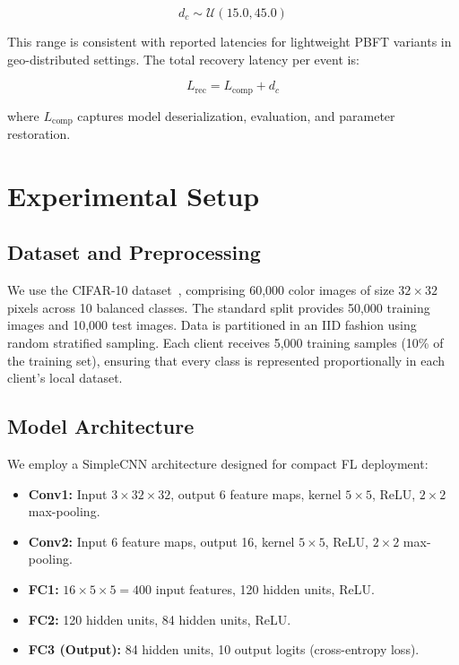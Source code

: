 \documentclass[conference]{IEEEtran}
\begin{document}
\begin{equation}
d_c \sim \mathcal{U}(15.0, 45.0)
\end{equation}

This range is consistent with reported latencies for lightweight PBFT variants in geo-distributed settings. The total recovery latency per event is:

\begin{equation}
L_{\text{rec}} = L_{\text{comp}} + d_c
\end{equation}

where $L_{\text{comp}}$ captures model deserialization, evaluation, and parameter restoration.

\section{Experimental Setup}
\label{sec:experiments}

\subsection{Dataset and Preprocessing}
We use the CIFAR-10 dataset~\cite{krizhevsky2009cifar}, comprising 60,000 color images of size $32\times32$ pixels across 10 balanced classes. The standard split provides 50,000 training images and 10,000 test images. Data is partitioned in an IID fashion using random stratified sampling. Each client receives 5,000 training samples (10\% of the training set), ensuring that every class is represented proportionally in each client's local dataset.

\subsection{Model Architecture}
We employ a SimpleCNN architecture designed for compact FL deployment:

\begin{itemize}
    \item \textbf{Conv1:} Input $3 \times 32 \times 32$, output 6 feature maps, kernel $5 \times 5$, ReLU, $2 \times 2$ max-pooling.
    \item \textbf{Conv2:} Input 6 feature maps, output 16, kernel $5 \times 5$, ReLU, $2 \times 2$ max-pooling.
    \item \textbf{FC1:} $16 \times 5 \times 5 = 400$ input features, 120 hidden units, ReLU.
    \item \textbf{FC2:} 120 hidden units, 84 hidden units, ReLU.
    \item \textbf{FC3 (Output):} 84 hidden units, 10 output logits (cross-entropy loss).
\end{itemize}
\end{document}
